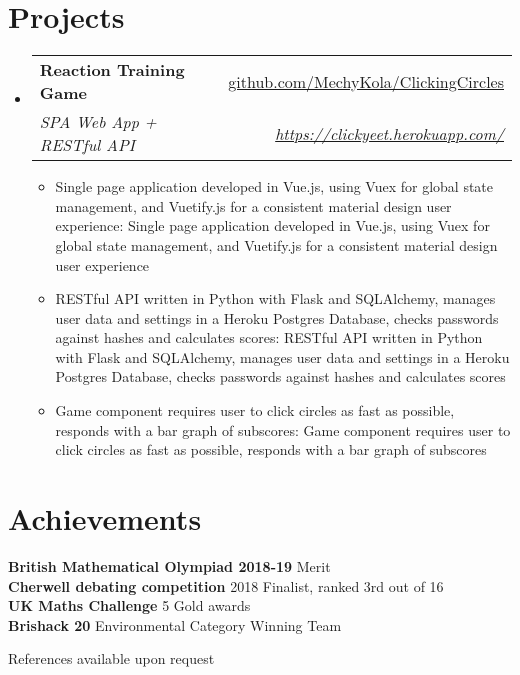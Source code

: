 \documentclass[a4paper,11pt]{article}
\makeatletter
\def \ifempty#1{\def\temp{#1} \ifx\temp\empty }
\newcommand{\resumeItem}[2]{
  \item\small{
  	\ifempty{#1}#2\else\textbf{#1}{: #2 \vspace{-2pt}}\fi
  }
}
\newcommand{\resumeSubheading}[4]{
  \vspace{-1pt}\item
    \begin{tabular*}{0.97\textwidth}{l@{\extracolsep{\fill}}r}
      \textbf{#1} & #2 \\
      \textit{\small#3} & \textit{\small #4} \\
    \end{tabular*}\vspace{-5pt}
}
\newcommand{\resumeSubHeadingListStart}{\begin{itemize}[leftmargin=*]}
\newcommand{\resumeSubHeadingListEnd}{\end{itemize}}
\newcommand{\resumeItemListStart}{\begin{itemize}}
\newcommand{\resumeItemListEnd}{\end{itemize}\vspace{-5pt}}
\makeatother
\begin{document}
\section{Projects}
  \resumeSubHeadingListStart
    \resumeSubheading
      {Reaction Training Game}{\href{https://github.com/MechyKola/ClickingCircles}
      {github.com/MechyKola/ClickingCircles}}
      {SPA Web App + RESTful API}{\href{https://clickyeet.herokuapp.com/}
      {https://clickyeet.herokuapp.com/}}
      \resumeItemListStart
        \resumeItem{}
          {Single page application developed in Vue.js, using Vuex for global state management,
          and Vuetify.js for a consistent material design
          user experience}
        \resumeItem{}
          {RESTful API written in Python with Flask and SQLAlchemy, manages user data and 
          settings in a Heroku Postgres Database, checks passwords against 
          hashes and calculates scores}
        \resumeItem{}
          {Game component requires user to click circles as fast as possible, responds with
          a bar graph of subscores}
      \resumeItemListEnd
  \resumeSubHeadingListEnd


\section{Achievements}
  \textbf{British Mathematical Olympiad 2018-19}{ Merit} \\
  \textbf{Cherwell debating competition}{ 2018 Finalist, ranked 3rd out of 16} \\
  \textbf{UK Maths Challenge}{ 5 Gold  awards} \\
  \textbf{Brishack 20}{ Environmental Category Winning Team} \\
  
  
\bigskip
\centerline{References available upon request}
\end{document}
